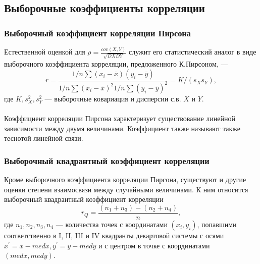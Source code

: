 \subsection{Выборочные коэффициенты корреляции}
\subsubsection{Выборочный коэффициент корреляции Пирсона}
Естественной оценкой для $\rho = \frac{cov(X,Y)}{\sqrt{DXDY}}$ служит его статистический аналог в виде выборочного коэффициента корреляции, предложенного К.Пирсоном, —
\begin{equation} \label{eq:r}
r = \frac{1/n\sum(x_i-\overline{x})(y_i-\overline{y})} 
{1/n\sum (x_i-\overline{x})^2 1/n\sum (y_i-\overline{y})^2} 
= K/(s_Xs_Y),
\end{equation}
где $K, s^2_X, s^2_Y$ — выборочные ковариация и дисперсии с.в. $X$ и $Y$. \\ \\
Коэффициент корреляции Пирсона характеризует существование линейной зависимости между двумя величинами. Коэффициент также называют также теснотой линейной связи. \cite{theory}

\subsubsection{Выборочный квадрантный коэффициент корреляции}
Кроме выборочного коэффициента корреляции Пирсона, существуют и другие оценки степени взаимосвязи между случайными величинами. К ним относится выборочный квадрантный коэффициент корреляции 
\begin{equation} \label{eq:r}
r_Q = \frac{(n_1+n_3)-(n_2+n_4)} 
{n},
\end{equation}
где $n_1, n_2, n_3, n_4$ — количества точек с координатами $(x_i, y_i)$, попавшими соответственно в I, II, III и IV квадранты декартовой системы с осями $x^{'} = x -  med x, y^{'} = y -  med y$ и с центром в точке с координатами $(med x, med y)$. \cite{theory}


